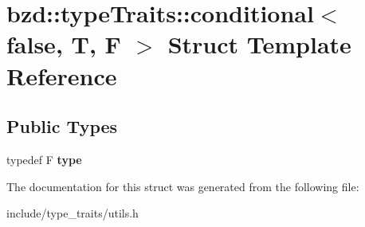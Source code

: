\hypertarget{structbzd_1_1typeTraits_1_1conditional_3_01false_00_01T_00_01F_01_4}{}\section{bzd\+:\+:type\+Traits\+:\+:conditional$<$ false, T, F $>$ Struct Template Reference}
\label{structbzd_1_1typeTraits_1_1conditional_3_01false_00_01T_00_01F_01_4}
\subsection*{Public Types}
\begin{DoxyCompactItemize}
\item 
\mbox{\label{structbzd_1_1typeTraits_1_1conditional_3_01false_00_01T_00_01F_01_4_ad620f5593c4ad14cc3c8b9213d0b2ddc}} 
typedef F {\bfseries type}
\end{DoxyCompactItemize}


The documentation for this struct was generated from the following file\+:\begin{DoxyCompactItemize}
\item 
include/type\+\_\+traits/utils.\+h\end{DoxyCompactItemize}
